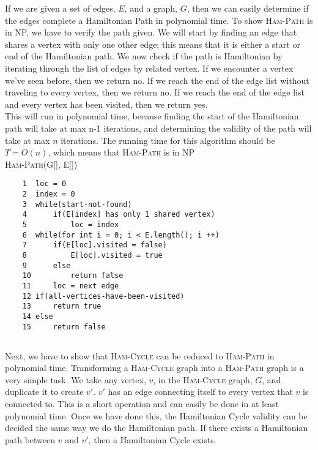 \documentclass{article}
\begin{document}
If we are given a set of edges, $E$, and a graph, $G$, then we can easily determine if the edges complete a Hamiltonian Path in polynomial time.  To show \textsc{Ham-Path} is in NP, we have to verify the path given.  We will start by finding an edge that shares a vertex with only one other edge; this means that it is either a start or end of the Hamiltonian path.  We now check if the path is Hamiltonian by iterating through the list of edges by related vertex.  If we encounter a vertex we've seen before, then we return no.  If we reach the end of the edge list without traveling to every vertex, then we return no.  If we reach the end of the edge list and every vertex has been visited, then we return yes.\\

This will run in polynomial time, because finding the start of the Hamiltonian path will take at max n-1 iterations, and determining the validity of the path will take at max $n$ iterations.  The running time for this algorithm should be $T = O(n)$, which means that \textsc{Ham-Path} is in NP\\

\textsc{Ham-Path(G[], E[])}

\begin{verbatim}
    1  loc = 0
    2  index = 0
    3  while(start-not-found)
    4      if(E[index] has only 1 shared vertex)
    5          loc = index
    6  while(for int i = 0; i < E.length(); i ++)
    7      if(E[loc].visited = false)
    8          E[loc].visited = true
    9      else
    10         return false
    11     loc = next edge
    12 if(all-vertices-have-been-visited)
    13     return true
    14 else
    15     return false
\end{verbatim}

\subsection{}

Next, we have to show that \textsc{Ham-Cycle} can be reduced to \textsc{Ham-Path} in polynomial time.  Transforming a \textsc{Ham-Cycle} graph into a \textsc{Ham-Path} graph is a very simple task.  We take any vertex, $v$, in the \textsc{Ham-Cycle} graph, $G$, and duplicate it to create $v'$.  $v'$ has an edge connecting itself to every vertex that $v$ is connected to.  This is a short operation and can easily be done in at least polynomial time.  Once we have done this, the Hamiltonian Cycle validity can be decided the same way we do the Hamiltonian path.  If there exists a Hamiltonian path between $v$ and $v'$, then a Hamiltonian Cycle exists.\\
\end{document}
